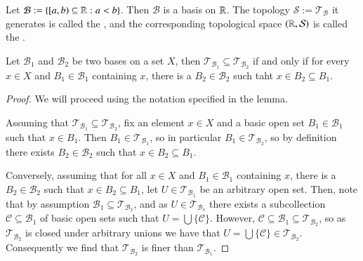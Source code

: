 \begin{definition}
    Let $\mathcal{B} := \{[a,b)\subseteq\mathbb R:a <b\}$. Then $\mathcal{B}$ is a basis on $\mathbb R$. The topology $\mathcal{S} := \mathcal{T}_{\mathcal{B}}$ it generates is called the , and the corresponding topological space $(\mathbb R,\mathcal{S})$ is called the . 
\end{definition}

\begin{lemma}
    Let $\mathcal{B}_1$ and $\mathcal{B}_2$ be two bases on a set $X$, then $\mathcal{T}_{\mathcal{B}_1} \subseteq \mathcal{T}_{\mathcal{B}_2}$ if and only if for every $x \in X$ and $B_1 \in \mathcal{B}_1$ containing $x$, there is a $B_2 \in \mathcal{B}_2$ such taht $x \in B_2 \subseteq B_1$.
\end{lemma}
\begin{proof}
    We will proceed using the notation specified in the lemma.

    Assuming that $\mathcal{T}_{\mathcal{B}_1}\subseteq \mathcal{T}_{\mathcal{B}_2}$, fix an element $x \in X$ and a basic open set $B_1 \in \mathcal{B}_1$ such that $x \in B_1$. Then $B_1 \in \mathcal{T}_{\mathcal{B}_1}$, so in particular $B_1 \in \mathcal{T}_{\mathcal{B}_2}$, so by definition there exists $B_2 \in \mathcal{B}_2$ such that $x \in B_2 \subseteq B_1$.


    Conversely, assuming that for all $x \in X$ and $B_1 \in \mathcal{B}_1$ containing $x$, there is a $B_2 \in \mathcal{B}_2$ such that $x \in B_2 \subseteq B_1$, let $U \in \mathcal{T}_{\mathcal{B}_1}$ be an arbitrary open set. Then, note that by assumption $\mathcal{B}_1 \subseteq \mathcal{T}_{\mathcal{B}_2}$, and as $U \in \mathcal{T}_{\mathcal{B}_1}$ there exists a subcollection $\mathcal{C} \subseteq \mathcal{B}_1$ of basic open sets such that $U = \bigcup\{\mathcal{C}\}$. However, $\mathcal{C} \subseteq \mathcal{B}_1\subseteq\mathcal{T}_{\mathcal{B}_2}$, so as $\mathcal{T}_{\mathcal{B}_2}$ is closed under arbitrary unions we have that $U =\bigcup\{\mathcal{C}\} \in \mathcal{T}_{\mathcal{B}_2}$. Consequently we find that $\mathcal{T}_{\mathcal{B}_2}$ is finer than $\mathcal{T}_{\mathcal{B}_1}$.
\end{proof}

